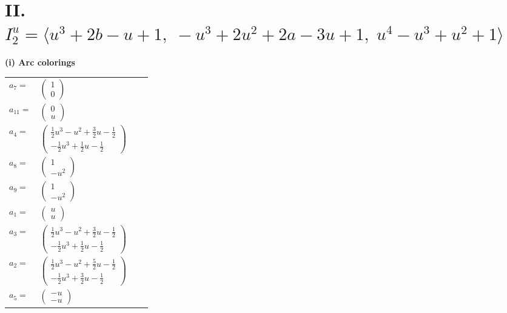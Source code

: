 \documentclass[1p]{elsarticle_modified}
\theoremstyle{definition}
\begin{document}
\centering \section*{II. $I^u_{2}= \langle u^3+2 b- u+1,\;- u^3+2 u^2+2 a-3 u+1,\;u^4- u^3+u^2+1 \rangle$}
\flushleft \textbf{(i) Arc colorings}\\
\begin{tabular}{m{7pt} m{180pt} m{7pt} m{180pt} }
\flushright $a_{7}=$&$\begin{pmatrix}1\\0\end{pmatrix}$ \\
\flushright $a_{11}=$&$\begin{pmatrix}0\\u\end{pmatrix}$ \\
\flushright $a_{4}=$&$\begin{pmatrix}\frac{1}{2} u^3- u^2+\frac{3}{2} u-\frac{1}{2}\\-\frac{1}{2} u^3+\frac{1}{2} u-\frac{1}{2}\end{pmatrix}$ \\
\flushright $a_{8}=$&$\begin{pmatrix}1\\- u^2\end{pmatrix}$ \\
\flushright $a_{9}=$&$\begin{pmatrix}1\\- u^2\end{pmatrix}$ \\
\flushright $a_{1}=$&$\begin{pmatrix}u\\u\end{pmatrix}$ \\
\flushright $a_{3}=$&$\begin{pmatrix}\frac{1}{2} u^3- u^2+\frac{3}{2} u-\frac{1}{2}\\-\frac{1}{2} u^3+\frac{1}{2} u-\frac{1}{2}\end{pmatrix}$ \\
\flushright $a_{2}=$&$\begin{pmatrix}\frac{1}{2} u^3- u^2+\frac{5}{2} u-\frac{1}{2}\\-\frac{1}{2} u^3+\frac{3}{2} u-\frac{1}{2}\end{pmatrix}$ \\
\flushright $a_{5}=$&$\begin{pmatrix}- u\\- u\end{pmatrix}$ \\

\end{tabular}
\end{document}
